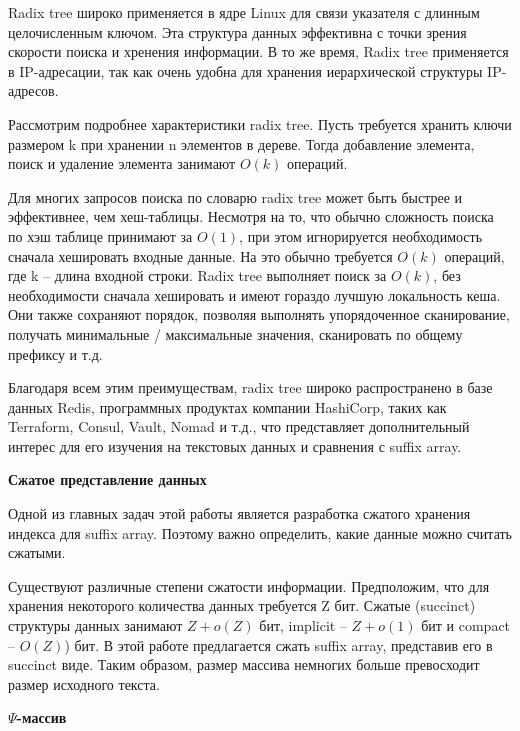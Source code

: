 Radix tree широко применяется в ядре Linux для связи указателя с длинным целочисленным ключом.
Эта структура данных эффективна с точки зрения скорости поиска и хренения информации.
В то же время, Radix tree применяется в IP-адресации, так как очень удобна для хранения
иерархической структуры IP-адресов.

Рассмотрим подробнее характеристики radix tree. Пусть требуется хранить ключи размером k
при хранении n элементов в дереве. Тогда добавление элемента, поиск и удаление элемента
занимают $O(k)$ операций.

Для многих запросов поиска по словарю radix tree может быть быстрее и эффективнее, чем хеш-таблицы.
Несмотря на то, что обычно сложность поиска по хэш таблице принимают за $O(1)$,
при этом игнорируется необходимость сначала хешировать входные данные.
На это обычно требуется $O(k)$ операций, где k -- длина входной строки.
Radix tree выполняет поиск за $O(k)$, без необходимости сначала хешировать и имеют гораздо лучшую локальность кеша.
Они также сохраняют порядок, позволяя выполнять упорядоченное сканирование,
получать минимальные / максимальные значения, сканировать по общему префиксу и т.д.

Благодаря всем этим преимуществам, radix tree широко распространено в базе данных Redis, программных продуктах
компании HashiCorp, таких как Terraform, Consul, Vault, Nomad и т.д.,
что представляет дополнительный интерес для его изучения на текстовых данных и сравнения с suffix array.

\textbf{Сжатое представление данных}

Одной из главных задач этой работы является разработка сжатого хранения индекса для suffix array.
Поэтому важно определить, какие данные можно считать сжатыми.

Существуют различные степени сжатости информации.
Предположим, что для хранения некоторого количества данных требуется Z бит.
Сжатые (succinct) структуры данных занимают \(Z + o(Z)\) бит, implicit -- \(Z + o(1)\) бит и
compact -- \(O(Z)\)) бит. В этой работе предлагается сжать suffix array, представив его в succinct виде.
Таким образом, размер массива немногих больше превосходит размер исходного текста.

\textbf{$\Psi$-массив}

